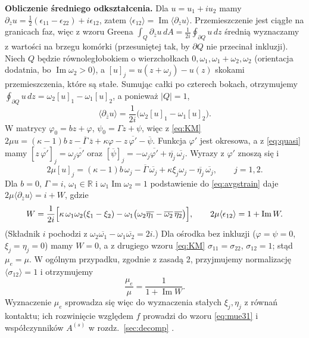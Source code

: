 \documentclass[12pt,a4paper,twoside,openright]{report}
\theoremstyle{definition}
\theoremstyle{remark}
\newcommand{\R}{\mathbb{R}}
\newcommand{\cc}[1]{\overline{#1}}
\renewcommand{\Im}{\operatorname{Im}}
\begin{document}
\textbf{Obliczenie średniego odkształcenia.} Dla $u=u_1+iu_2$ mamy $\partial_{\bar z}u=\tfrac12(\epsilon_{11}-\epsilon_{22})+i\epsilon_{12}$, zatem $\langle\epsilon_{12}\rangle=\Im\langle\partial_{\bar z}u\rangle$. Przemieszczenie jest ciągłe na granicach faz, więc z wzoru Greena $\int_Q\partial_{\bar z}u\,dA=\frac1{2i}\oint_{\partial Q}u\,dz$ średnią wyznaczamy z wartości na brzegu komórki (przesuniętej tak, by $\partial Q$ nie przecinał inkluzji). Niech $Q$ będzie równoległobokiem o wierzchołkach $0,\omega_1,\omega_1+\omega_2,\omega_2$ (orientacja dodatnia, bo $\Im\omega_2>0$), a $[u]_j=u(z+\omega_j)-u(z)$ skokami przemieszczenia, które są stałe. Sumując całki po czterech bokach, otrzymujemy $\oint_{\partial Q}u\,dz=\omega_2[u]_1-\omega_1[u]_2$, a ponieważ $|Q|=1$,
\begin{equation}\label{eq:avgstrain}
{\langle\partial_{\bar z}u\rangle=\frac1{2i}\bigl(\omega_2[u]_1-\omega_1[u]_2\bigr).}
\end{equation}
W matrycy $\varphi_0=bz+\varphi$, $\psi_0=\Gamma z+\psi$, więc z \eqref{eq:KM} $2\mu u=(\kappa-1)b\,z-\cc\Gamma\,\cc z+\kappa\varphi-z\,\cc{\varphi'}-\cc\psi$. Funkcja $\varphi'$ jest okresowa, a z \eqref{eq:quasi} mamy $[z\,\cc{\varphi'}]_j=\omega_j\cc{\varphi'}$ oraz $[\cc\psi]_j=-\omega_j\cc{\varphi'}+\cc{\eta_j}\,\cc{\omega_j}$. Wyrazy z $\varphi'$ znoszą się i
\begin{equation*}
{2\mu[u]_j=(\kappa-1)b\,\omega_j-\cc\Gamma\,\cc{\omega_j}+\kappa\xi_j\omega_j-\cc{\eta_j}\,\cc{\omega_j},\qquad j=1,2.}
\end{equation*}
Dla $b=0$, $\Gamma=i$, $\omega_1\in\R$ i $\omega_1\Im\omega_2=1$ podstawienie do \eqref{eq:avgstrain} daje $2\mu\langle\partial_{\bar z}u\rangle=i+W$, gdzie
\begin{equation*}
{W=\frac1{2i}\Bigl[\kappa\,\omega_1\omega_2(\xi_1-\xi_2)-\omega_1\bigl(\omega_2\cc{\eta_1}-\cc{\omega_2}\,\cc{\eta_2}\bigr)\Bigr],\qquad 2\mu\langle\epsilon_{12}\rangle=1+\Im W.}
\end{equation*}
(Składnik $i$ pochodzi z $\omega_2\cc{\omega_1}-\omega_1\cc{\omega_2}=2i$.) Dla ośrodka bez inkluzji ($\varphi=\psi=0$, $\xi_j=\eta_j=0$) mamy $W=0$, a z drugiego wzoru \eqref{eq:KM} $\sigma_{11}=\sigma_{22}$, $\sigma_{12}=1$; stąd $\mu_e=\mu$. W ogólnym przypadku, zgodnie z zasadą 2, przyjmujemy normalizację $\langle\sigma_{12}\rangle=1$ i otrzymujemy
\begin{equation*}
{\frac{\mu_e}{\mu}=\frac1{1+\Im W}.}
\end{equation*}
Wyznaczenie $\mu_e$ sprowadza się więc do wyznaczenia stałych $\xi_j,\eta_j$ z równań kontaktu; ich rozwinięcie względem $f$ prowadzi do wzoru \eqref{eq:mue31} i współczynników $A^{(s)}$ w rozdz.~\ref{sec:decomp} \cite{czapla2025computational,drygas2019applied}.
\end{document}
